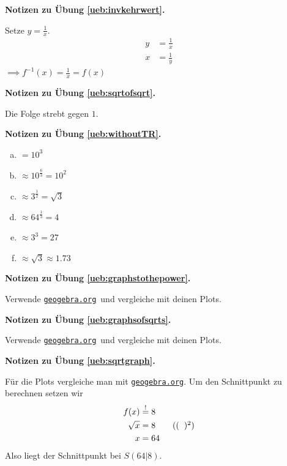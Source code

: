 \documentclass[%
11pt,%
twoside,%
titlepage,%
swissgerman,%
headsepline%
]{scrartcl}
\newcommand{\faReturnGray}{\textcolor{gray}{\faMailReply}} %
\newcommand{\geogebralink}{\href{https://www.geogebra.org/calculator}{\texttt{geogebra.org}}}
\theoremstyle{definition}
\theoremstyle{plain}
\newcommand{\concatueb}[1]{ueb:#1}%
\newcommand{\concatlsg}[1]{lsg:#1}%
\newenvironment{lsg}[1]{%
    \par\noindent\textbf{Notizen zu Übung \ref{\concatueb{#1}}.}%
    \label{\concatlsg{#1}} %
    \hfill\hyperref[\concatueb{#1}]{\faReturnGray}\par %
}{%
    \par%
}
\begin{document}
\begin{lsg}{invkehrwert}
  Setze $y=\frac{1}{x}$.
  \begin{align*}
    y &= \frac{1}{x}\tag{$\cdot x$, $\div y$}\\
    x &= \frac{1}{y}
  \end{align*}
    $\implies f^{-1}(x)=\frac{1}{x}=f(x)$
\end{lsg}


\begin{lsg}{sqrtofsqrt}
  Die Folge strebt gegen $1$.
\end{lsg}

\begin{lsg}{withoutTR}
  \begin{enumerate}[a)]
    \item $=10^3$
    \item $\approx10^\frac{6}{3}=10^2$
    \item $\approx3^\frac{1}{2}=\sqrt{3}$
    \item $\approx64^\frac{1}{3}=4$
    \item $\approx3^3=27$
    \item $\approx\sqrt{3}\approx1.73$
  \end{enumerate}
\end{lsg}

\begin{lsg}{graphstothepower}
  Verwende \geogebralink\   und vergleiche mit deinen Plots.
\end{lsg}

\begin{lsg}{graphsofsqrts}
  Verwende \geogebralink\   und vergleiche mit deinen Plots.
\end{lsg}

\begin{lsg}{sqrtgraph}
  Für die Plots vergleiche man mit \geogebralink . Um den Schnittpunkt zu berechnen setzen wir
  \begin{align*}
    f(x) &\stackrel{!}{=} 8\\
    \sqrt{x} &= 8\tag{$(\phantom{x})^2$}\\
    x &= 64
  \end{align*}
  Also liegt der Schnittpunkt bei $S(64|8)$.
\end{lsg}
\end{document}
